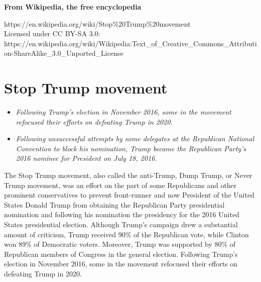 \textbf{From Wikipedia, the free encyclopedia}

https://en.wikipedia.org/wiki/Stop\%20Trump\%20movement\\
Licensed under CC BY-SA 3.0:\\
https://en.wikipedia.org/wiki/Wikipedia:Text\_of\_Creative\_Commons\_Attribution-ShareAlike\_3.0\_Unported\_License

\section{Stop Trump movement}\label{stop-trump-movement}

\begin{itemize}
\item
  \emph{Following Trump's election in November 2016, some in the
  movement refocused their efforts on defeating Trump in 2020.}
\item
  \emph{Following unsuccessful attempts by some delegates at the
  Republican National Convention to block his nomination, Trump became
  the Republican Party's 2016 nominee for President on July 18, 2016.}
\end{itemize}

The Stop Trump movement, also called the anti-Trump, Dump Trump, or
Never Trump movement, was an effort on the part of some Republicans and
other prominent conservatives to prevent front-runner and now President
of the United States Donald Trump from obtaining the Republican Party
presidential nomination and following his nomination the presidency for
the 2016 United States presidential election. Although Trump's campaign
drew a substantial amount of criticism, Trump received 90\% of the
Republican vote, while Clinton won 89\% of Democratic voters. Moreover,
Trump was supported by 80\% of Republican members of Congress in the
general election. Following Trump's election in November 2016, some in
the movement refocused their efforts on defeating Trump in 2020.

